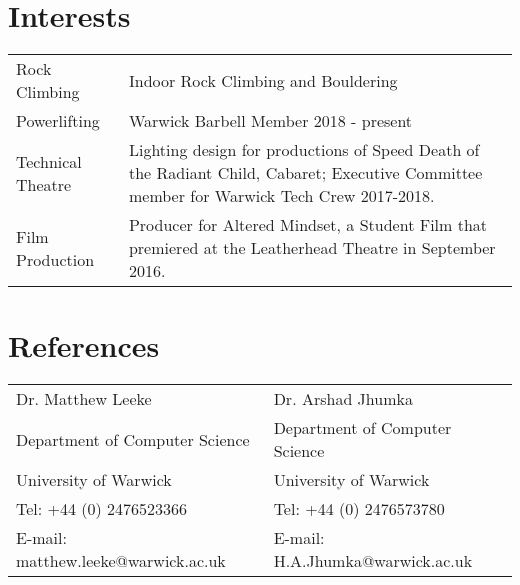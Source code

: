 \documentclass[11pt]{article}
\begin{document}
  \section*{Interests}
   \begin{center}
    \begin{tabularx}{\linewidth}{ X X }
Rock Climbing & Indoor Rock Climbing and Bouldering \\
Powerlifting & Warwick Barbell Member 2018 - present \\
Technical Theatre & Lighting design for productions of Speed Death of the Radiant
Child, Cabaret; Executive Committee member for Warwick Tech Crew 2017-2018.\\
Film Production & Producer for Altered Mindset, a Student Film that premiered at 
the Leatherhead Theatre in September 2016.
    \end{tabularx}
   \end{center}

  \section*{References}
   \begin{center}
    \begin{tabularx}{5in}{ X X }
Dr. Matthew Leeke & Dr. Arshad Jhumka \\
Department of Computer Science & Department of Computer Science \\
University of Warwick & University of Warwick \\
Tel: +44 (0) 2476523366 & Tel: +44 (0) 2476573780 \\
E-mail: matthew.leeke@warwick.ac.uk & E-mail: H.A.Jhumka@warwick.ac.uk 
    \end{tabularx}
   \end{center}
\end{document}
